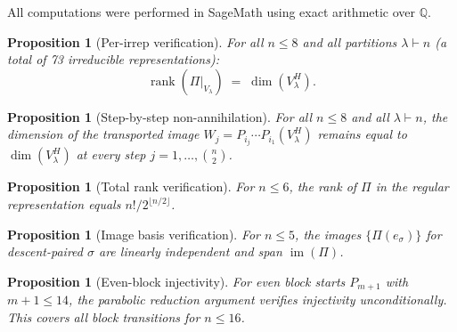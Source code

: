 \documentclass[11pt]{article}
\newtheorem{proposition}[theorem]{Proposition}
\theoremstyle{definition}
\theoremstyle{remark}
\newcommand{\im}{\operatorname{im}}
\newcommand{\rk}{\operatorname{rank}}
\begin{document}
All computations were performed in SageMath using exact arithmetic
over $\mathbb{Q}$.

\begin{proposition}[Per-irrep verification]\label{prop:per-irrep}
For all $n \le 8$ and all partitions $\lambda \vdash n$ (a total
of 73 irreducible representations):
\[
  \rk(\Pi|_{V_\lambda}) \;=\; \dim(V_\lambda^H).
\]
\end{proposition}

\begin{proposition}[Step-by-step non-annihilation]\label{prop:step-verify}
For all $n \le 8$ and all $\lambda \vdash n$, the dimension of the
transported image $W_j = P_{i_j} \cdots P_{i_1}(V_\lambda^H)$
remains equal to $\dim(V_\lambda^H)$ at every step $j = 1, \ldots,
\binom{n}{2}$.
\end{proposition}

\begin{proposition}[Total rank verification]\label{prop:total-verify}
For $n \le 6$, the rank of $\Pi$ in the regular representation
equals $n!/2^{\lfloor n/2 \rfloor}$.
\end{proposition}

\begin{proposition}[Image basis verification]\label{prop:basis-verify}
For $n \le 5$, the images $\{\Pi(e_\sigma)\}$ for descent-paired
$\sigma$ are linearly independent and span $\im(\Pi)$.
\end{proposition}

\begin{proposition}[Even-block injectivity]\label{prop:even-verify}
For even block starts $P_{m+1}$ with $m + 1 \le 14$,
the parabolic reduction argument verifies injectivity
unconditionally. This covers all block transitions for $n \le 16$.
\end{proposition}

\medskip
\end{document}
